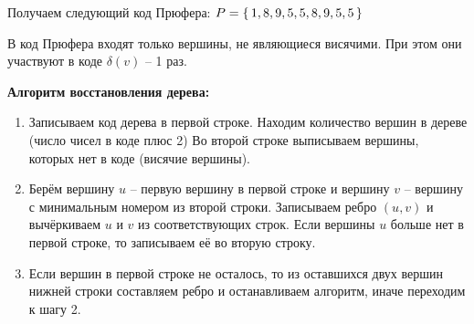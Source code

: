 Получаем следующий код Прюфера: $P=\set{1,8,9,5,5,8,9,5,5}$

В код Прюфера входят только вершины, не являющиеся висячими.
При этом они участвуют в коде $\delta(v)$ -- 1 раз.

\textbf{Алгоритм восстановления дерева:}
\begin{enumerate}[left=0.0em, labelsep=1em, topsep=0.0em, itemsep=0pt, parsep=0.5em]
    \item Записываем код дерева в первой строке. Находим количество вершин
    в дереве (число чисел в коде плюс 2) Во второй строке выписываем вершины,
    которых нет в коде (висячие вершины).
    \item Берём вершину $u$ -- первую вершину в первой строке и вершину $v$ --
    вершину с минимальным номером из второй строки. Записываем ребро $(u, v)$
    и вычёркиваем $u$ и $v$ из соответствующих строк. Если вершины $u$ больше нет
    в первой строке, то записываем её во вторую строку.
    \item Если вершин в первой строке не осталось, то из оставшихся двух
    вершин нижней строки составляем ребро и останавливаем алгоритм, иначе
    переходим к шагу 2.
\end{enumerate}

